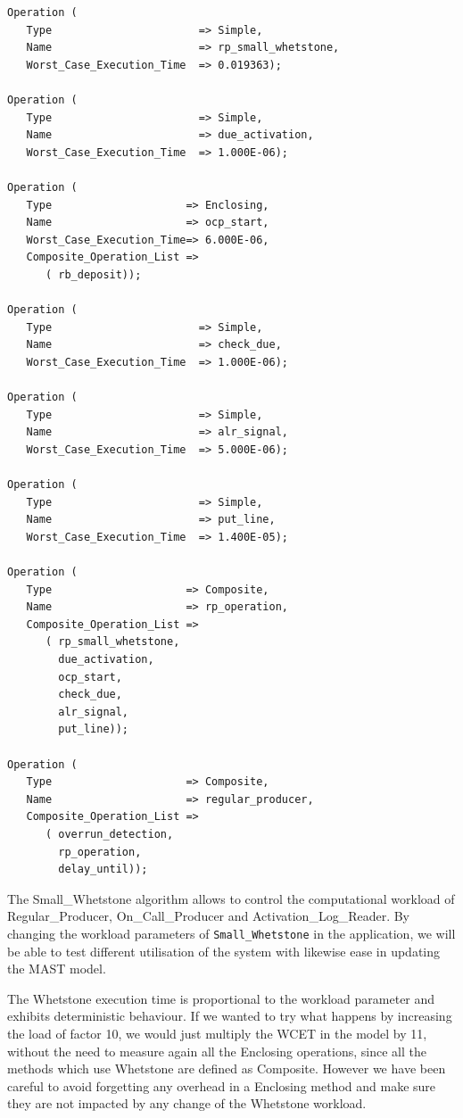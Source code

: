 \documentclass{article}
\begin{document}
\begin{lstlisting}
Operation (
   Type                       => Simple,
   Name                       => rp_small_whetstone,
   Worst_Case_Execution_Time  => 0.019363);

Operation (
   Type                       => Simple,
   Name                       => due_activation,
   Worst_Case_Execution_Time  => 1.000E-06);

Operation (
   Type                     => Enclosing,
   Name                     => ocp_start,
   Worst_Case_Execution_Time=> 6.000E-06,
   Composite_Operation_List =>
      ( rb_deposit));

Operation (
   Type                       => Simple,
   Name                       => check_due,
   Worst_Case_Execution_Time  => 1.000E-06);

Operation (
   Type                       => Simple,
   Name                       => alr_signal,
   Worst_Case_Execution_Time  => 5.000E-06);

Operation (
   Type                       => Simple,
   Name                       => put_line,
   Worst_Case_Execution_Time  => 1.400E-05);

Operation (
   Type                     => Composite,
   Name                     => rp_operation,
   Composite_Operation_List =>
      ( rp_small_whetstone,
        due_activation,
        ocp_start,
        check_due,
        alr_signal,
        put_line));

Operation (
   Type                     => Composite,
   Name                     => regular_producer,
   Composite_Operation_List =>
      ( overrun_detection,
        rp_operation,
        delay_until));
\end{lstlisting}

The Small\_Whetstone algorithm allows to control the computational workload of Regular\_Producer, On\_Call\_Producer and Activation\_Log\_Reader. By changing the workload parameters of \texttt{Small\_Whetstone} in the application, we will be able to test different utilisation of the system with likewise ease in updating the MAST model.

The Whetstone execution time is proportional to the workload parameter and exhibits deterministic behaviour. If we wanted to try what happens by increasing the load of factor 10, we would just multiply the WCET in the model by 11, without the need to measure again all the Enclosing operations, since all the methods which use Whetstone are defined as Composite. However we have been careful to avoid forgetting any overhead in a Enclosing method and make sure they are not impacted by any change of the Whetstone workload.
\end{document}
